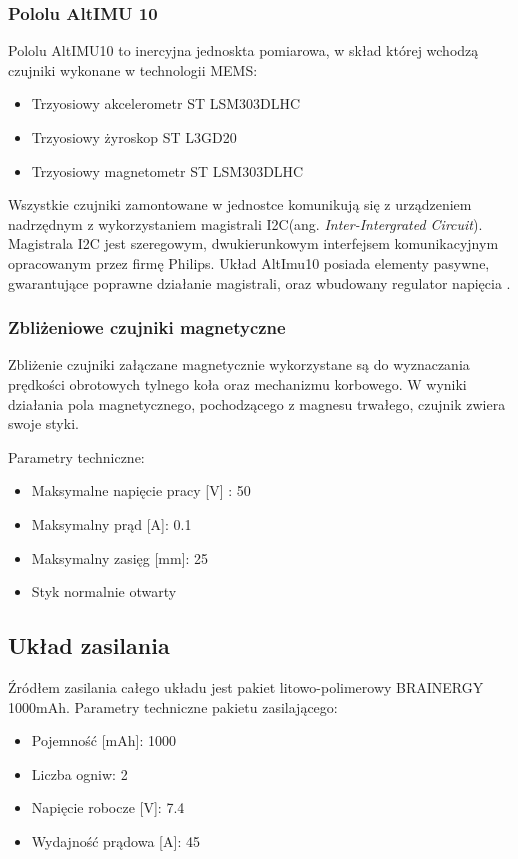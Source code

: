 \subsubsection{Pololu AltIMU 10}

Pololu AltIMU10 to inercyjna jednoskta pomiarowa, w skład której wchodzą czujniki wykonane w technologii MEMS:
\begin{itemize}
\item
Trzyosiowy akcelerometr ST LSM303DLHC
\item
Trzyosiowy żyroskop ST L3GD20
\item
Trzyosiowy magnetometr ST LSM303DLHC
\end{itemize}

Wszystkie czujniki zamontowane w jednostce komunikują się z urządzeniem nadrzędnym z wykorzystaniem magistrali I2C(ang. {\em Inter-Intergrated Circuit}). Magistrala I2C jest szeregowym, dwukierunkowym interfejsem komunikacyjnym opracowanym przez firmę Philips. Układ AltImu10 posiada elementy pasywne, gwarantujące poprawne działanie magistrali, oraz wbudowany regulator napięcia \cite{Pololu}.
\subsubsection{Zbliżeniowe czujniki magnetyczne}
Zbliżenie czujniki załączane magnetycznie wykorzystane są do wyznaczania prędkości obrotowych tylnego koła oraz mechanizmu korbowego. W wyniki działania pola magnetycznego, pochodzącego z magnesu trwałego, czujnik zwiera swoje styki. 
 
Parametry techniczne:
\begin{itemize}
\item
Maksymalne napięcie pracy [V] : 50
\item
Maksymalny prąd [A]: 0.1
\item
Maksymalny zasięg [mm]: 25
\item
Styk normalnie otwarty
\end{itemize}
\subsection{Układ zasilania}
Źródłem zasilania całego układu jest pakiet litowo-polimerowy BRAINERGY 1000mAh.
Parametry techniczne pakietu zasilającego:
\begin{itemize}
\item
Pojemność [mAh]: 1000
\item
Liczba ogniw: 2
\item
Napięcie robocze [V]: 7.4
\item
Wydajność prądowa [A]: 45
\end{itemize}

